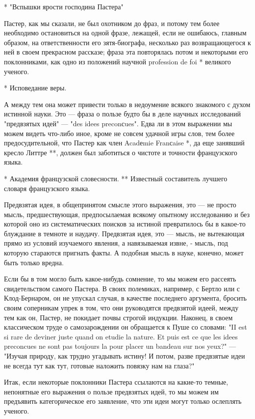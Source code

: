 * "Вспышки ярости господина Пастера"

Пастер, как мы  сказали, не был  охотником до фраз,  и потому тем  более
необходимо остановиться  на  одной  фразе, лежащей,  если  не  ошибаюсь,
главным образом,  на ответственности  его зятя-биографа,  несколько  раз
возвращающегося к ней в своем прекрасном рассказе; фраза эта повторялась
потом и  некоторыми  его поклонниками,  как  одно из  положений  научной
profession de foi * великого ученого.

* Исповедание веры.

А между тем она может привести  только в недоумение всякого знакомого  с
духом истинной  науки. Это  --- фраза  о пользе  будто бы  в деле  научных
исследований "предвзятых идей" --- "des idees preconсues". Едва ли в  этом
выражении мы можем видеть  что-либо иное, кроме  не совсем удачной  игры
слов,  тем  более  предосудительной,   что  Пастер  как  член   Acadеmie
Franсaise *, да еще занявший кресло  Литтре **, должен был заботиться  о
чистоте и точности французского языка.

* Академия французской словесности.
** Известный составитель лучшего словаря французского языка.

Предвзятая идея, в общепринятом смысле этого выражения, это --- не  просто
мысль, предшествующая,  предпосылаемая всякому  опытному исследованию  и
без которой оно из систематических поисков за истиной превратилось бы  в
какое-то блуждание в темноте и наудачу. Предвзятая идея, это --- мысль, не
вытекающая прямо из условий изучаемого явления, а навязываемая извне,  -
мысль, под которую стараются пригнать  факты. А подобная мысль в  науке,
конечно, может быть только вредна.

Если бы в том могло быть какое-нибудь сомнение, то мы можем его рассеять
свидетельством самого Пастера. В своих полемиках, например, с Бертло или
с Клод-Бернаром, он не упускал случая, в качестве последнего  аргумента,
бросить своим соперникам  упрек в  том, что  они руководятся  предвзятой
идеей, между тем  как он,  Пастер, не покидает  почвы строгой  индукции.
Наконец, в своем  классическом труде  о самозарождении  он обращается  к
Пуше со словами: "II  est si rare  de deviner juste  quand on etudie  la
nature. Et puis est ce que les idees preconcues ne sont pas toujours  la
pour placer un  bandeau sur  nos yeux?"  --- "Изучая  природу, как  трудно
угадывать истину! И потом, разве предвзятые идеи не всегда тут как  тут,
готовые наложить повязку нам на глаза?"

Итак, если некоторые  поклонники Пастера ссылаются  на какие-то  темные,
непонятные его  выражения  о пользе  предвзятых  идей, то  мы  можем  им
предъявить категорическое  его  заявление,  что эти  идеи  могут  только
ослеплять ученого.


